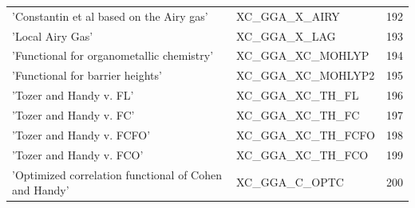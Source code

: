 \documentclass[final,12pt,makeidx,DIV=calc]{article}
\begin{document}
{{{\begin{table}[!h]
\begin{center}
\begin{tabular}{llr}
  'Constantin et al based on the Airy gas' & XC\_GGA\_X\_AIRY  &192\\
  'Local Airy Gas' & XC\_GGA\_X\_LAG  &193\\
  'Functional for organometallic chemistry' & XC\_GGA\_XC\_MOHLYP  &194\\
  'Functional for barrier heights' & XC\_GGA\_XC\_MOHLYP2  &195\\
  'Tozer and Handy v. FL' & XC\_GGA\_XC\_TH\_FL  &196\\
  'Tozer and Handy v. FC' & XC\_GGA\_XC\_TH\_FC  &197\\
  'Tozer and Handy v. FCFO' & XC\_GGA\_XC\_TH\_FCFO  &198\\
  'Tozer and Handy v. FCO' & XC\_GGA\_XC\_TH\_FCO  &199\\
  'Optimized correlation functional of Cohen and Handy' & XC\_GGA\_C\_OPTC  &200\\
\hline
\hline
\end{tabular}
\end{center}
\end{table}

}}}
\end{document}
